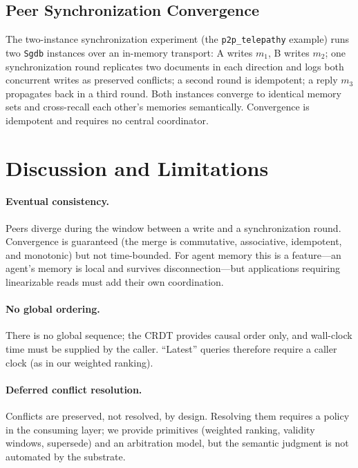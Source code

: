 \documentclass[11pt,twocolumn]{article}
\begin{document}
\subsection{Peer Synchronization Convergence}
\label{sec:eval-sync}
The two-instance synchronization experiment (the \texttt{p2p\_telepathy}
example) runs two \texttt{Sgdb} instances over an
in-memory transport: A writes $m_1$, B writes $m_2$; one synchronization round
replicates two documents in each direction and logs both concurrent writes as
preserved conflicts; a second round is idempotent; a reply $m_3$ propagates
back in a third round. Both instances converge to identical memory sets and
cross-recall each other's memories semantically. Convergence is idempotent and
requires no central coordinator.

\section{Discussion and Limitations}
\label{sec:discussion}

\paragraph{Eventual consistency.}
Peers diverge during the window between a write and a synchronization round.
Convergence is guaranteed (the merge is commutative, associative, idempotent,
and monotonic) but not time-bounded. For agent memory this is a feature---an
agent's memory is local and survives disconnection---but applications requiring
linearizable reads must add their own coordination.

\paragraph{No global ordering.}
There is no global sequence; the CRDT provides causal order only, and
wall-clock time must be supplied by the caller. ``Latest'' queries therefore
require a caller clock (as in our weighted ranking).

\paragraph{Deferred conflict resolution.}
Conflicts are preserved, not resolved, by design. Resolving them requires a
policy in the consuming layer; we provide primitives (weighted ranking,
validity windows, supersede) and an arbitration model, but the semantic
judgment is not automated by the substrate.
\end{document}
